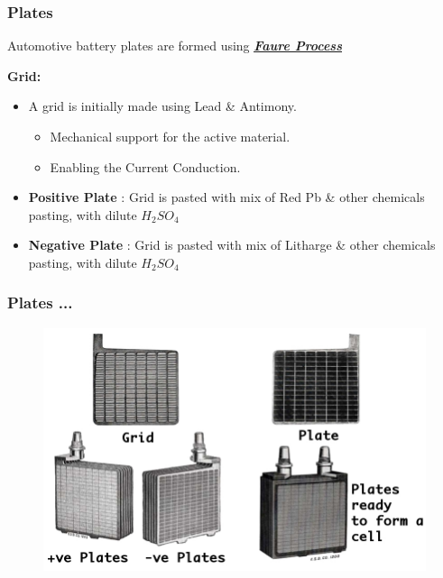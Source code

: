 \documentclass{beamer}
\begin{document}
\begin{frame}     %
  \frametitle{Plates}
  \fontsize{8pt}{15}\selectfont
  \vspace{-20pt}
  \begin{center}
    Automotive battery plates are formed using \href{https://en.wikipedia.org/wiki/Camille_Alphonse_Faure}{\textit{\textbf{\underline{Faure Process}}}}
  \end{center}
    
    \textbf{Grid:}
    \begin{itemize}
      \item A grid is initially made using Lead \& Antimony.
        \begin{itemize}
          \fontsize{8pt}{15}\selectfont
          \item Mechanical support for the active material.
          \item Enabling the Current Conduction.
        \end{itemize}
      \item \textbf{Positive Plate} : Grid is pasted with mix of Red Pb \& other chemicals pasting, with dilute $H_{2}SO_{4}$
      \item \textbf{Negative Plate} : Grid is pasted with mix of Litharge \& other chemicals pasting, with dilute $H_{2}SO_{4}$      
    \end{itemize}

\end{frame}


\begin{frame}   %
  \frametitle{Plates ...}
  \begin{figure}
    \includegraphics[width=0.8\linewidth]{./Resources/Images/grids_plates_groups.jpg}
  \end{figure}
\end{frame}
\end{document}
